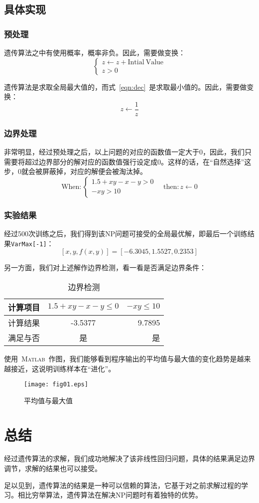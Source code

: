 \documentclass[12pt]{article}
\begin{document}
\subsection{具体实现}
\subsubsection{预处理}
遗传算法之中有使用概率，概率非负。因此，需要做变换：
\begin{equation}\left\{
\begin{array}{l}
z  \gets z + \mathrm{Intial~Value}\\
z>0
\end{array}\right.
\end{equation}\par
遗传算法是求取全局最大值的，而式~\eqref{eqn:dec}~是求取最小值的。因此，需要做变换：
\begin{equation}
z\gets \dfrac{1}{z}
\end{equation}
\subsubsection{边界处理}
非常明显，经过预处理之后，以上问题的对应的函数值一定大于0，因此，我们只需要将超过边界部分的解对应的函数值强行设定成0。这样的话，在“自然选择”这步，0就会被屏蔽掉，对应的解便会被淘汰掉。
\begin{equation}
\mathrm{When:}\left\{
\begin{array}{l}
1.5 + xy - x - y > 0\\
 - xy > 10
 \end{array}\right.
 \quad \mathrm{then:}
 z\gets 0
\end{equation}
\subsubsection{实验结果}
经过500次训练之后，我们得到该NP问题可接受的全局最优解，即最后一个训练结果\texttt{VarMax[-1]}：
\begin{equation}
\left[x,y,f\left(x,y\right)\right]= \left[-6.3045 , 1.5527 ,0.2353 \right]
\end{equation}\par
另一方面，我们对上述解作边界检测，看一看是否满足边界条件：
\begin{table}[H]
\centering
\caption{边界检测}
\begin{tabular}{lcr}
\toprule
计算项目&$1.5+xy - x - y \le 0$&$-xy\le 10$
\\\midrule
计算结果&-3.5377 &  9.7895\\
满足与否&是&是
\\\bottomrule
\end{tabular}
\end{table}\par
使用~\textsc{Matlab}~作图，我们能够看到程序输出的平均值与最大值的变化趋势是越来越接近，这说明训练样本在“进化”。
\begin{figure}[H]
\centering
\texttt{[image: fig01.eps]}
\caption{平均值与最大值}
\end{figure}
\section{总结}
经过遗传算法的求解，我们成功地解决了该非线性回归问题，具体的结果满足边界调节，求解的结果也可以接受。\par
足以见到，遗传算法的结果是一种可以信赖的算法，它基于对之前求解过程的学习。相比穷举算法，遗传算法在解决NP问题时有着独特的优势。
\end{document}

